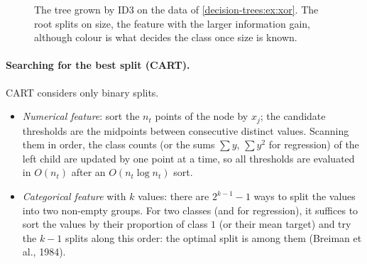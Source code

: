 \begin{notechapter}
\begin{figure}[ht]
\centering
{}
\caption{The tree grown by ID3 on the data of \cref{decision-trees:ex:xor}. The root splits
on size, the feature with the larger information gain, although colour is what
decides the class once size is known.}
\label{decision-trees:fig:xor}
\end{figure}

\paragraph{Searching for the best split (CART).} CART considers only binary splits.
\begin{itemize}[nosep]
  \item \emph{Numerical feature}: sort the $n_t$ points of the node by $x_j$; the candidate
        thresholds are the midpoints between consecutive distinct values. Scanning them in
        order, the class counts (or the sums $\sum y$, $\sum y^2$ for regression) of the left child
        are updated by one point at a time, so all thresholds are evaluated in $O(n_t)$ after
        an $O(n_t\log n_t)$ sort.
  \item \emph{Categorical feature} with $k$ values: there are $2^{k-1} - 1$ ways to split the values into
        two non-empty groups. For two classes (and for regression), it suffices to sort the
        values by their proportion of class $1$ (or their mean target) and try the $k - 1$ splits
        along this order: the optimal split is among them (Breiman et al., 1984).
\end{itemize}


\end{notechapter}
